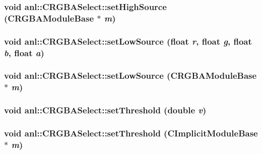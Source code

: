 \label{classanl_1_1CRGBASelect_a645a5e2d7644d7e532dcd184bbf2c483}
\hypertarget{classanl_1_1CRGBASelect_a0b66f46c0cbfe71d32f1aac3525e2da9}{
\subsubsection[{setHighSource}]{\setlength{\rightskip}{0pt plus 5cm}void anl::CRGBASelect::setHighSource ({\bf CRGBAModuleBase} $\ast$ {\em m})}}
\label{classanl_1_1CRGBASelect_a0b66f46c0cbfe71d32f1aac3525e2da9}
\hypertarget{classanl_1_1CRGBASelect_aec79546eeb08014ec62a25fb1e372e0b}{
\subsubsection[{setLowSource}]{\setlength{\rightskip}{0pt plus 5cm}void anl::CRGBASelect::setLowSource (float {\em r}, \/  float {\em g}, \/  float {\em b}, \/  float {\em a})}}
\label{classanl_1_1CRGBASelect_aec79546eeb08014ec62a25fb1e372e0b}
\hypertarget{classanl_1_1CRGBASelect_af37c7fa8987e1fb5beb450e772b1a5ca}{
\subsubsection[{setLowSource}]{\setlength{\rightskip}{0pt plus 5cm}void anl::CRGBASelect::setLowSource ({\bf CRGBAModuleBase} $\ast$ {\em m})}}
\label{classanl_1_1CRGBASelect_af37c7fa8987e1fb5beb450e772b1a5ca}
\hypertarget{classanl_1_1CRGBASelect_a860572b5057eb62a3a596b53796e658a}{
\subsubsection[{setThreshold}]{\setlength{\rightskip}{0pt plus 5cm}void anl::CRGBASelect::setThreshold (double {\em v})}}
\label{classanl_1_1CRGBASelect_a860572b5057eb62a3a596b53796e658a}
\hypertarget{classanl_1_1CRGBASelect_a38cfcc116321b4a34ca6998ee464102d}{
\subsubsection[{setThreshold}]{\setlength{\rightskip}{0pt plus 5cm}void anl::CRGBASelect::setThreshold ({\bf CImplicitModuleBase} $\ast$ {\em m})}}
\label{classanl_1_1CRGBASelect_a38cfcc116321b4a34ca6998ee464102d}


